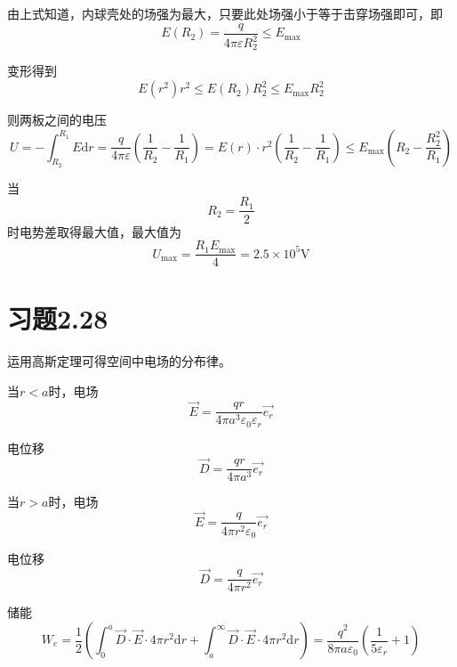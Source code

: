 \documentclass{SCIS2020cn}
\begin{document}
由上式知道，内球壳处的场强为最大，只要此处场强小于等于击穿场强即可，即
\begin{equation}
    E(R_2)=\frac{q}{4\pi\varepsilon{}R_2^2}\leqslant{}E_{\max}
\end{equation}

变形得到
\begin{equation}
    E(r^2)r^2\leqslant{}E(R_2)R_2^2\leqslant{}E_{\max}R_2^2
\end{equation}

则两板之间的电压
\begin{equation}
    U=-\int_{R_2}^{R_1}E\text{d}r=\frac{q}{4\pi\varepsilon}\left(\frac{1}{R_2}-\frac{1}{R_1}\right)=E(r)·r^2\left(\frac{1}{R_2}-\frac{1}{R_1}\right)\leqslant{}E_{\max}\left(R_2-\frac{R_2^2}{R_1}\right)
\end{equation}

当
\begin{equation}
    R_2=\frac{R_1}{2}
\end{equation}
时电势差取得最大值，最大值为
\begin{equation}
    U_{\max}=\frac{R_1E_{\max}}{4}=2.5×10^5\text{V}
\end{equation}

\section{习题2.28}
运用高斯定理可得空间中电场的分布律。

当$r<a$时，电场
\begin{equation}
    \overrightarrow{E}=\frac{qr}{4\pi{}a^3\varepsilon_0\varepsilon_r}\overrightarrow{e_r}
\end{equation}

电位移
\begin{equation}
    \overrightarrow{D}=\frac{qr}{4\pi{}a^3}\overrightarrow{e_r}
\end{equation}

当$r>a$时，电场
\begin{equation}
    \overrightarrow{E}=\frac{q}{4\pi{}r^2\varepsilon_0}\overrightarrow{e_r}
\end{equation}

电位移
\begin{equation}
    \overrightarrow{D}=\frac{q}{4\pi{}r^2}\overrightarrow{e_r}
\end{equation}

储能
\begin{equation}
    W_e=\frac{1}{2}\left(\int_0^a\overrightarrow{D}·\overrightarrow{E}·4\pi{}r^2\text{d}r+\int_a^{\infty}\overrightarrow{D}·\overrightarrow{E}·4\pi{}r^2\text{d}r\right)=\frac{q^2}{8\pi{}a\varepsilon_0}\left(\frac{1}{5\varepsilon_r}+1\right)
\end{equation}
\end{document}
